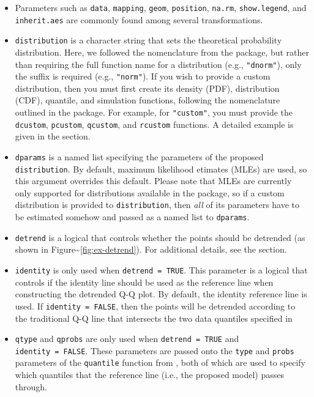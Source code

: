 \begin{itemize}
\item
  Parameters such as \texttt{data}, \texttt{mapping}, \texttt{geom},
  \texttt{position}, \texttt{na.rm}, \texttt{show.legend}, and
  \texttt{inherit.aes} are commonly found among several 
  transformations.
\item
  \texttt{distribution} is a character string that sets the theoretical
  probability distribution. Here, we followed the nomenclature from the
   package, but rather than requiring the full function name
  for a distribution (e.g., \texttt{"dnorm"}), only the suffix is
  required (e.g., \texttt{"norm"}). If you wish to provide a custom
  distribution, then you must first create its density (PDF),
  distribution (CDF), quantile, and simulation functions, following the
  nomenclature outlined in the  package. For example, for
  \texttt{"custom"}, you must provide the \texttt{dcustom},
  \texttt{pcustom}, \texttt{qcustom}, and \texttt{rcustom} functions. A
  detailed example is given in the  section.
\item
  \texttt{dparams} is a named list specifying the parameters of the
  proposed \texttt{distribution}. By default, maximum likelihood
  etimates (MLEs) are used, so this argument overrides this default.
  Please note that MLEs are currently only supported for distributions
  available in the  package, so if a custom distribution is
  provided to \texttt{distribution}, then \emph{all} of its parameters
  have to be estimated somehow and passed as a named list to
  \texttt{dparams}.
\item
  \texttt{detrend} is a logical that controls whether the points should
  be detrended (as shown in
  Figure\textasciitilde{}\ref{fig:ex-detrend}). For additional details,
  see the  section.
\item
  \texttt{identity} is only used when \texttt{detrend\ =\ TRUE}. This
  parameter is a logical that controls if the identity line should be
  used as the reference line when constructing the detrended Q-Q plot.
  By default, the identity reference line is used. If
  \texttt{identity\ =\ FALSE}, then the points will be detrended
  according to the traditional Q-Q line that intersects the two data
  quantiles specified in 
\item
  \texttt{qtype} and \texttt{qprobs} are only used when
  \texttt{detrend\ =\ TRUE} and \texttt{identity\ =\ FALSE}. These
  parameters are passed onto the \texttt{type} and \texttt{probs}
  parameters of the \texttt{quantile} function from , both of
  which are used to specify which quantiles that the reference line
  (i.e., the proposed model) passes through.
\end{itemize}

